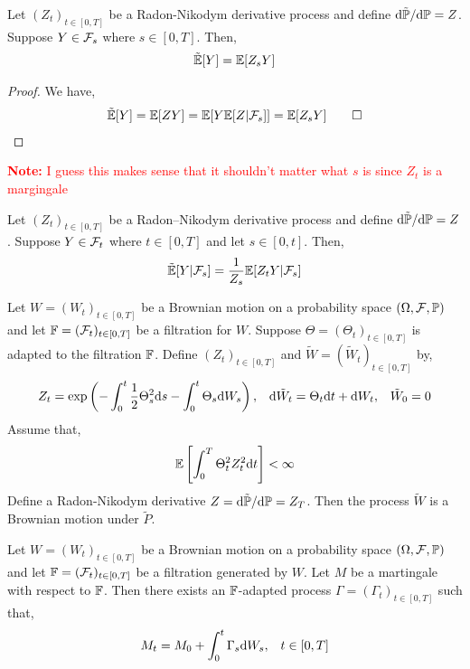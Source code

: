 \documentclass[12pt]{article}
\newcommand{\note}[1]{\textcolor{red}{\textbf{Note:} #1}}
\begin{document}
\begin{lemma}
Let \( (Z_t)_{t\in[0,T]} \) be a Radon-Nikodym derivative process and define \( \mathrm{d} \tilde{\mathbb{P}}/\mathrm{d} \mathbb{P} = Z \). Suppose \( Y\in\mathcal{F}_s \) where \( s\in[0,T] \). Then,
\begin{align*}
    \tilde{\mathbb{E}}[Y] = \mathbb{E}[Z_sY]
\end{align*}
\end{lemma}

\begin{proof}
We have,
\begin{align*}
    \tilde{\EE}[Y] = \EE[ZY] = \EE[Y\EE[Z|\cF_s]] = \EE[Z_sY] \tag*{\qed}
\end{align*}
\end{proof}

\note{I guess this makes sense that it shouldn't matter what \( s \) is since \( Z_t \) is a margingale}

\begin{lemma}
Let \( (Z_t)_{t\in[0,T]} \) be a Radon--Nikodym derivative process and define \( \mathrm{d} \tilde{\mathbb{P}}/\mathrm{d} \mathbb{P} = Z \). Suppose \( Y\in\mathcal{F}_t \) where \( t\in[0,T] \) and let \( s\in [0,t] \). Then,
\begin{align*}
    \tilde{\mathbb{E}}[Y|\mathcal{F}_s] = \frac{1}{Z_s} \mathbb{E}[Z_tY|\mathcal{F}_s]
\end{align*}
\end{lemma}

\begin{theorem}[Girsanov]
Let \( W = (W_t)_{t\in[0,T]} \) be a Brownian motion on a probability space \( (\Omega,\mathcal{F},\mathbb{P}) \) and let \( \mathbb{F} = (\mathcal{F}_t)_{t\in[0,T]} \) be a filtration for \( W \). Suppose \( \Theta = (\Theta_t)_{t\in[0,T]} \) is adapted to the filtration \( \mathbb{F} \). Define \( (Z_t)_{t\in[0,T]} \) and \( \tilde{W} = (\tilde{W}_t)_{t\in[0,T]} \) by,
\begin{align*}
    Z_t = \exp \left( -\int_0^t \frac{1}{2} \Theta_s^2\mathrm{d} s - \int_0^t\Theta_s\mathrm{d} W_s \right)
    ,&& \mathrm{d} \tilde{W}_t = \Theta_t\mathrm{d} t + \mathrm{d} W_t
    ,&& \tilde{W}_0 = 0
\end{align*}
Assume that,
\begin{align*}
    \mathbb{E} \left[ \int_0^T \Theta_t^2Z_t^2\mathrm{d} t \right] < \infty
\end{align*}
Define a Radon-Nikodym derivative \( Z = \mathrm{d} \tilde{\mathbb{P}}/\mathrm{d} \mathbb{P} = Z_T \). Then the process \( \tilde{W} \) is a Brownian motion under \( \tilde{P} \).
\end{theorem}


\begin{theorem}
Let \( W = (W_t)_{t\in[0,T]} \) be a Brownian motion on a probability space \( (\Omega,\mathcal{F},\mathbb{P}) \) and let \( \mathbb{F} = (\mathcal{F}_t)_{t\in[0,T]} \) be a filtration generated by \( W \). Let \( M \) be a martingale with respect to \( \mathbb{F} \). Then there exists an \( \mathbb{F} \)-adapted process \( \Gamma = (\Gamma_t)_{t\in[0,T]} \) such that,
\begin{align*}
    M_t = M_0 + \int_0^t \Gamma_s\mathrm{d} W_s, && t\in[0,T]
\end{align*}
\end{theorem}
\end{document}
